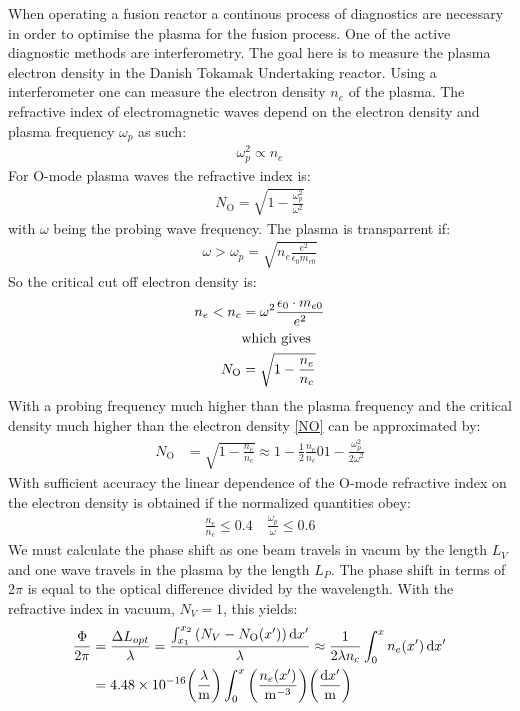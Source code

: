 When operating a fusion reactor a continous process of diagnostics are necessary in order to optimise the plasma for the fusion process. One of the active diagnostic methods are interferometry.
The goal here is to measure the plasma electron density in the Danish Tokamak Undertaking reactor.
Using a interferometer one can measure the electron density \(n_e\) of the plasma. The refractive index of electromagnetic waves depend on the electron density and plasma frequency \(\omega_p\) as such:
\begin{align}
  \omega_p^2 \propto n_e
\end{align}
For O-mode plasma waves the refractive index is:
\begin{align}
  N_{\mathrm{O}} = \sqrt{1-\frac{\omega_p^2}{\omega^2}}
\end{align}
with \(\omega\) being the probing wave frequency.
The plasma is transparrent if:
\begin{align}
  \omega > \omega_p = \sqrt{n_e\frac{e^2}{\epsilon_0 m_{e0}}}
\end{align}
So the critical cut off electron density is:
\begin{align}
  n_e < n_c &= \omega^2\frac{\epsilon_0\cdot m_{e0}}{e^2} \label{nenc}\\
  &\qq*{which gives} \nonumber \\
  N_{\mathrm{O}} &= \sqrt{1-\frac{n_e}{n_c}}\label{NO}
\end{align}
With a probing frequency much higher than the plasma frequency and the critical density much higher than the electron density \cref{NO} can be approximated by:
\begin{align}
  N_{\mathrm{O}} &= \sqrt{1-\frac{n_e}{n_c}} \approx 1-\frac{1}{2}\frac{n_e}{n_c} 0 1-\frac{\omega_p^2}{2\omega^2}
\end{align}
With sufficient accuracy the linear dependence of the O-mode refractive index on the electron density is obtained if the normalized quantities obey:
\begin{align}
  \frac{n_e}{n_c} \leq 0.4 \quad \frac{\omega_p}{\omega} \leq 0.6
\end{align}
We must calculate the phase shift as one beam travels in vacum by the length \(L_V\) and one wave travels in the plasma by the length \(L_P\). The phase shift in terms of \(2 \pi\) is equal to the optical difference divided by the wavelength. With the refractive index in vacuum, \(N_V=1\), this yields:
\begin{align}
  \frac{\Phi}{2\pi} &= \frac{\Delta L_{opt}}{\lambda} = \frac{\int_{x_1}^{x_2}\pqty{N_V-N_{\mathrm{O}}(x')}\dd{x'}}{\lambda} \approx \frac{1}{2\lambda n_c}\int_{0}^{x}n_e(x')\dd{x'}\\
  &= 4.48\times 10^{-16} \pqty{\frac{\lambda}{\si{\meter}}}\int_{0}^{x}\pqty{\frac{n_e(x')}{\si{\per\meter\cubed}}}\pqty{\frac{\dd{x'}}{\si{\meter}}}
\end{align}
